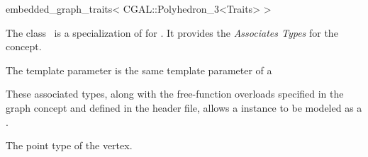 

\begin{ccRefClass}{embedded_graph_traits< CGAL::Polyhedron_3<Traits> >}


\ccDefinition

The class \ccRefName\ is a specialization of 
for . It provides the {\em Associates Types} 
for the  concept.

The template parameter  is the same  template parameter 
of a 


These associated types, along with the free-function overloads specified in the graph concept
and defined in the header file, allows a  instance to be modeled as a .

\ccTypes
  {The point type of the vertex.}

\ccSeeAlso

\end{ccRefClass}


